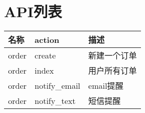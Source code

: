 \section{API列表}

\begin{center}
    \label{table:api_list}
    \begin{longtable}{lll}
        \toprule
        名称 & action & 描述\\
        \midrule
        order & create & 新建一个订单\\
        order & index & 用户所有订单\\
        order & notify_email & email提醒 \\
        order & notify_text & 短信提醒 \\
        
        \bottomrule
    \end{longtable}
\end{center}
